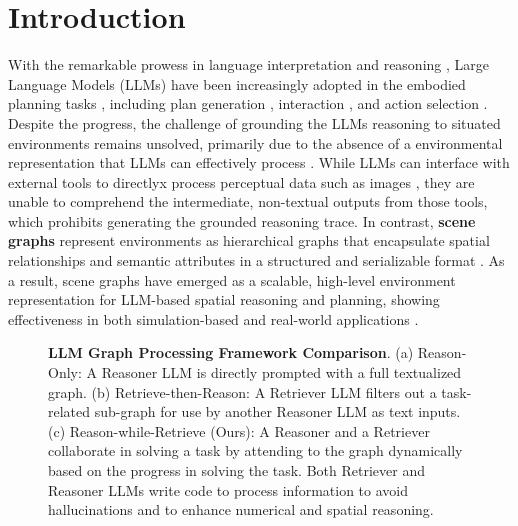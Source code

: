 \section{Introduction}
\label{sec:intro}

With the remarkable prowess in language interpretation and reasoning \citep{gpt4, llama2}, Large Language Models (LLMs) have been increasingly adopted in the embodied planning tasks \citep{huang2023embodied, innermono, socratic}, including plan generation \citep{LLMPlanner}, interaction \citep{joublin2024copal}, and action selection \citep{sayplan}.
Despite the progress, the challenge of grounding the LLMs reasoning to situated environments remains unsolved, primarily due to the absence of a environmental representation that LLMs can effectively process \citep{groundedDecoding}. 
While LLMs can interface with external tools to directlyx process perceptual data such as images \citep{CaP, voxposer}, they are unable to comprehend the intermediate, non-textual outputs from those tools, which prohibits generating the grounded reasoning trace.
In contrast, \textbf{scene graphs} represent environments as hierarchical graphs that encapsulate spatial relationships and semantic attributes in a structured and serializable format \cite{hierarchicalSg, hydra}. 
As a result, scene graphs have emerged as a scalable, high-level environment representation for LLM-based spatial reasoning and planning, showing effectiveness in both simulation-based \cite{octopus} and real-world applications \cite{sayplan, conceptgraphs, GRID, spatialrgpt}. 

\begin{figure*}[t!]
 
  \centering
 \vspace*{-0.1in}
  \caption{\textbf{LLM Graph Processing Framework Comparison}.
  (a) Reason-Only: A Reasoner LLM is directly prompted with a full textualized graph.
  (b) Retrieve-then-Reason: A Retriever LLM filters out a task-related sub-graph for use by another Reasoner LLM as text inputs.
  (c) Reason-while-Retrieve (Ours): A Reasoner and a Retriever collaborate in solving a task by attending to the graph dynamically based on the progress in solving the task. Both Retriever and Reasoner LLMs write code to process information to avoid hallucinations and to enhance numerical and spatial reasoning.
  }
  \vspace*{-0.2in}
 \label{fig:Overview}
\end{figure*}

